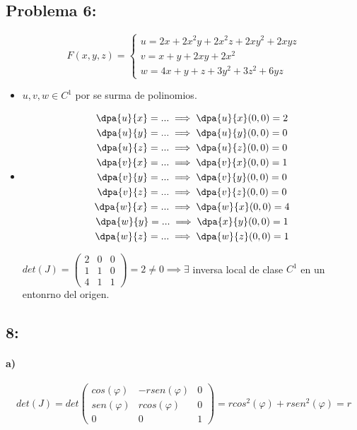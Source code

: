 \documentclass{apuntes}
\begin{document}
\subsection{Problema 6:}

$$F(x,y,z) = \left\{\begin{matrix}u = 2x+2x^2y+2x^2z+2xy^2+2xyz\\v=x+y+2xy+2x^2\\w=4x+y+z+3y^2+3z^2+6yz\end{matrix}\right.$$
\begin{itemize}
 \item $u,v,w \in C^1$ por se surma de polinomios. 
 \item \begin{gather*}
\dpa{u}{x} = ... \implies \dpa{u}{x}(0,0) = 2\\
\dpa{u}{y} = ... \implies \dpa{u}{y}(0,0) = 0\\
\dpa{u}{z} = ... \implies \dpa{u}{z}(0,0) = 0\\
\dpa{v}{x} = ... \implies \dpa{v}{x}(0,0) = 1\\
\dpa{v}{y} = ... \implies \dpa{v}{y}(0,0) = 0\\
\dpa{v}{z} = ... \implies \dpa{v}{z}(0,0) = 0\\
\dpa{w}{x} = ... \implies \dpa{w}{x}(0,0) = 4\\
\dpa{w}{y} = ... \implies \dpa{x}{y}(0,0) = 1\\
\dpa{w}{z} = ... \implies \dpa{w}{z}(0,0) = 1
       \end{gather*}
       
   $det(J) =\begin{pmatrix}
             2&0&0\\
             1&1&0\\
             4&1&1
            \end{pmatrix}
 = 2 \neq 0 \implies \exists $ inversa local de clase $C^1$ en un entonrno del origen.
\end{itemize}

\subsection{8:}
\paragraph{a)}

$$det(J) = det\begin{pmatrix}
       cos(\varphi)&-rsen(\varphi)&0\\
       sen(\varphi)&rcos(\varphi)&0\\
       0&0&1
      \end{pmatrix} = rcos^2(\varphi) + rsen^2(\varphi) = r$$
      
\end{document}
